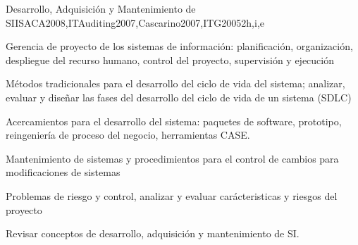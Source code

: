 \begin{syllabus}
    \begin{unit}{Desarrollo, Adquisición y Mantenimiento de SI}{}{ISACA2008,ITAuditing2007,Cascarino2007,ITG2005}{2}{h,i,e}
    \begin{topics}
    \item Gerencia de proyecto de los sistemas de información: planificación, organización, despliegue del recurso humano, control del proyecto, supervisión y ejecución
    \item Métodos tradicionales para el desarrollo del ciclo de vida del sistema; analizar, evaluar y diseñar las fases del desarrollo del ciclo de vida de un sistema (SDLC)
    \item Acercamientos para el desarrollo del sistema: paquetes de software, prototipo, reingeniería de proceso del negocio, herramientas CASE.
    \item Mantenimiento de sistemas y procedimientos para el control de cambios para modificaciones de sistemas
    \item Problemas de riesgo y control, analizar y evaluar carácteristicas y riesgos del proyecto
    \end{topics}
    \begin{learningoutcomes}
    \item Revisar conceptos de desarrollo, adquisición y mantenimiento de SI.
    \end{learningoutcomes}
    \end{unit}
    

\end{syllabus}
